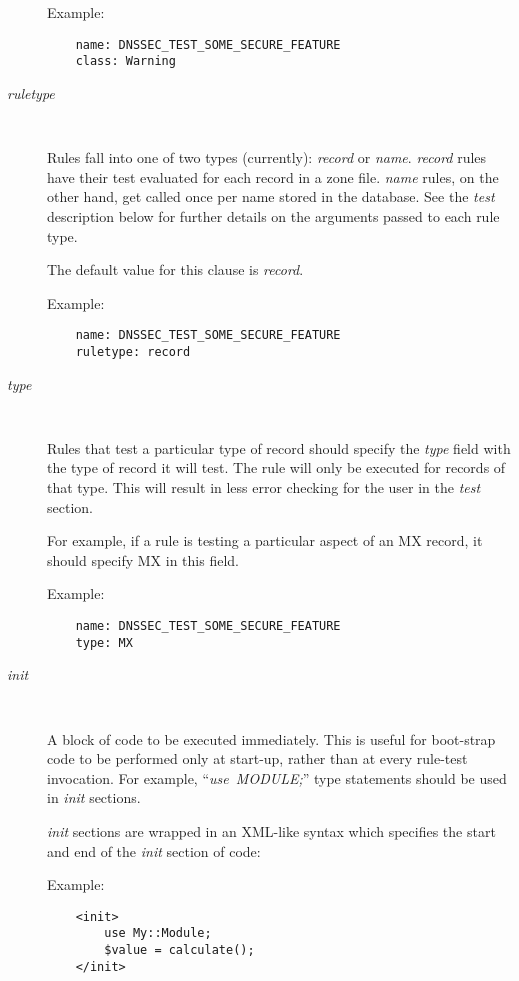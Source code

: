 \begin{description}
Example:
\begin{verbatim}
    name: DNSSEC_TEST_SOME_SECURE_FEATURE
    class: Warning
\end{verbatim}

\item [{\it ruletype}]\verb" "

Rules fall into one of two types (currently): {\it record} or {\it name}.
{\it record} rules have their test evaluated for each record in
a zone file.  {\it name} rules, on the other hand, get called once per
name stored in the database.  See the {\it test} description below for
further details on the arguments passed to each rule type.

The default value for this clause is {\it record}.

Example:

\begin{verbatim}
    name: DNSSEC_TEST_SOME_SECURE_FEATURE
    ruletype: record
\end{verbatim}

\item [{\it type}]\verb" "

Rules that test a particular type of record should specify the
{\it type} field with the type of record it will test.  The rule
will only be executed for records of that type.  This will result
in less error checking for the user in the {\it test} section.

For example, if a rule is testing a particular aspect of an MX record,
it should specify MX in this field.

Example:

\begin{verbatim}
    name: DNSSEC_TEST_SOME_SECURE_FEATURE
    type: MX
\end{verbatim}

\item [{\it init}]\verb" "

A block of code to be executed immediately. This is useful for
boot-strap code to be performed only at start-up, rather than
at every rule-test invocation.  For example, ``{\it use\ MODULE;}''
type statements should be used in {\it init} sections.

{\it init} sections are wrapped in an XML-like syntax which
specifies the start and end of the {\it init} section of code:

Example:
\begin{verbatim}
    <init>
        use My::Module;
        $value = calculate();
    </init>
\end{verbatim}


\end{description}
